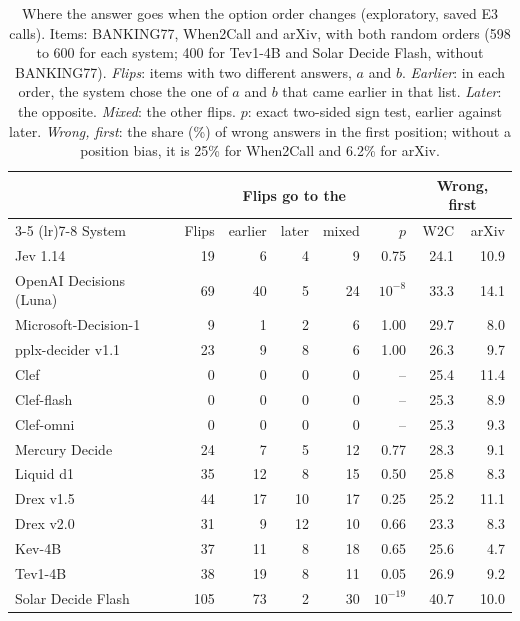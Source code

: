 \begin{table}[t]
\centering
\scriptsize
\setlength{\tabcolsep}{2.2pt}
\begin{tabular}{@{}lrrrrrrr@{}}
\toprule
 & & \multicolumn{3}{c}{Flips go to the} & & \multicolumn{2}{c}{Wrong, first} \\
\cmidrule(lr){3-5} \cmidrule(lr){7-8}
System & Flips & earlier & later & mixed & $p$ & W2C & arXiv \\
\midrule
Jev 1.14 & 19 & 6 & 4 & 9 & 0.75 & 24.1 & 10.9 \\
OpenAI Decisions (Luna) & 69 & 40 & 5 & 24 & $10^{-8}$ & 33.3 & 14.1 \\
Microsoft-Decision-1 & 9 & 1 & 2 & 6 & 1.00 & 29.7 & 8.0 \\
pplx-decider v1.1 & 23 & 9 & 8 & 6 & 1.00 & 26.3 & 9.7 \\
Clef & 0 & 0 & 0 & 0 & -- & 25.4 & 11.4 \\
Clef-flash & 0 & 0 & 0 & 0 & -- & 25.3 & 8.9 \\
Clef-omni & 0 & 0 & 0 & 0 & -- & 25.3 & 9.3 \\
Mercury Decide & 24 & 7 & 5 & 12 & 0.77 & 28.3 & 9.1 \\
Liquid d1 & 35 & 12 & 8 & 15 & 0.50 & 25.8 & 8.3 \\
Drex v1.5 & 44 & 17 & 10 & 17 & 0.25 & 25.2 & 11.1 \\
Drex v2.0 & 31 & 9 & 12 & 10 & 0.66 & 23.3 & 8.3 \\
Kev-4B & 37 & 11 & 8 & 18 & 0.65 & 25.6 & 4.7 \\
Tev1-4B & 38 & 19 & 8 & 11 & 0.05 & 26.9 & 9.2 \\
Solar Decide Flash & 105 & 73 & 2 & 30 & $10^{-19}$ & 40.7 & 10.0 \\
\bottomrule
\end{tabular}
\caption{Where the answer goes when the option order changes (exploratory, saved E3 calls). Items: BANKING77, When2Call and arXiv, with both random orders (598 to 600 for each system; 400 for Tev1-4B and Solar Decide Flash, without BANKING77). \emph{Flips}: items with two different answers, $a$ and $b$. \emph{Earlier}: in each order, the system chose the one of $a$ and $b$ that came earlier in that list. \emph{Later}: the opposite. \emph{Mixed}: the other flips. $p$: exact two-sided sign test, earlier against later. \emph{Wrong, first}: the share (\%) of wrong answers in the first position; without a position bias, it is 25\% for When2Call and 6.2\% for arXiv.}
\label{tab:app-position}
\end{table}
